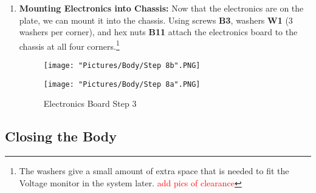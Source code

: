 \documentclass[12pt]{article}
\begin{document}
\begin{enumerate}
\item \textbf{Mounting Electronics into Chassis:} Now that the electronics are on the plate, we can mount it into the chassis. Using screws \textbf{B3}, washers \textbf{W1} (3 washers per corner), and hex nuts \textbf{B11} attach the electronics board to the chassis at all four corners.\footnote{The washers give a small amount of extra space that is needed to fit the Voltage monitor in the system later. \textcolor{red}{add pics of clearance}}

\begin{figure}[H]
  \centering
  \begin{minipage}[b]{0.40\textwidth}
    \texttt{[image: "Pictures/Body/Step 8b".PNG]}
  \end{minipage}
  \hfill
  \begin{minipage}[b]{0.40\textwidth}
    \texttt{[image: "Pictures/Body/Step 8a".PNG]}
  \end{minipage}
  \caption{Electronics Board Step 3}
\end{figure}
\end{enumerate}

\subsection{Closing the Body}
\end{document}
